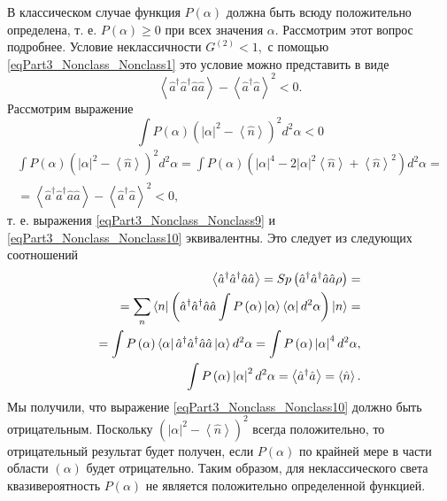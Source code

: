 В классическом случае функция $P\left(\alpha\right)$ должна быть всюду
положительно определена, т. е. $P\left(\alpha\right) \ge 0$ при всех
значения $\alpha$. Рассмотрим этот вопрос подробнее. Условие
неклассичности 
\(
G^{(2)} < 1, 
\)
с помощью \eqref{eqPart3_Nonclass_Nonclass1} это условие
можно представить в виде
\begin{equation}
\left<\hat{a}^{\dag}\hat{a}^{\dag}\hat{a}\hat{a}\right> -
\left<\hat{a}^{\dag}\hat{a}\right>^2 < 0.
\label{eqPart3_Nonclass_Nonclass9}
\end{equation}
Рассмотрим выражение
\begin{equation}
\int P\left(\alpha\right)\left(\left|\alpha\right|^2 -
\left<\hat{n}\right>\right)^2 d^2\alpha < 0
\label{eqPart3_Nonclass_Nonclass10}
\end{equation}
\begin{eqnarray}
\int P\left(\alpha\right)\left(\left|\alpha\right|^2 -
\left<\hat{n}\right>\right)^2 d^2\alpha = 
\int P\left(\alpha\right)\left(\left|\alpha\right|^4 -
2\left|\alpha\right|^2 \left<\hat{n}\right> +
\left<\hat{n}\right>^2\right) d^2\alpha = 
\nonumber \\
=
\left<\hat{a}^{\dag}\hat{a}^{\dag}\hat{a}\hat{a}\right> -
\left<\hat{a}^{\dag}\hat{a}\right>^2 < 0,
\nonumber
\end{eqnarray}
т. е. выражения \eqref{eqPart3_Nonclass_Nonclass9} и
\eqref{eqPart3_Nonclass_Nonclass10} эквивалентны. Это следует из
следующих соотношений
\begin{eqnarray}
  \left<\hat{a}^{\dag}\hat{a}^{\dag}\hat{a}\hat{a}\right> = Sp \left(
  \hat{a}^{\dag}\hat{a}^{\dag}\hat{a}\hat{a} \rho \right)=
  \nonumber \\
  =
  \sum_n \bra{n}\left(\hat{a}^{\dag}\hat{a}^{\dag}\hat{a}\hat{a}
  \int P\left(\alpha\right)
  \left|\alpha\right>\left<\alpha\right|d^2\alpha
  \right)
  \ket{n} =
  \nonumber \\
  =
  \int P\left(\alpha\right)
  \left<\alpha\right|\hat{a}^{\dag}\hat{a}^{\dag}\hat{a}\hat{a}\left|\alpha\right>
  d^2\alpha = 
\int P\left(\alpha\right)\left|\alpha\right|^4 d^2\alpha,
\nonumber \\
\int P\left(\alpha\right)\left|\alpha\right|^2 d^2\alpha = 
\left<\hat{a}^{\dag}\hat{a}\right> = \left<\hat{n}\right>.
\nonumber
\end{eqnarray}
Мы получили, что выражение \eqref{eqPart3_Nonclass_Nonclass10} должно
быть отрицательным. Поскольку 
\(
\left(\left|\alpha\right|^2 -
\left<\hat{n}\right>\right)^2
\)
всегда положительно, то отрицательный результат будет получен, если 
$P\left(\alpha\right)$ по крайней мере в части области $(\alpha)$
будет отрицательно. Таким образом, для неклассического света
квазивероятность $P\left(\alpha\right)$ не является положительно
определенной функцией.

